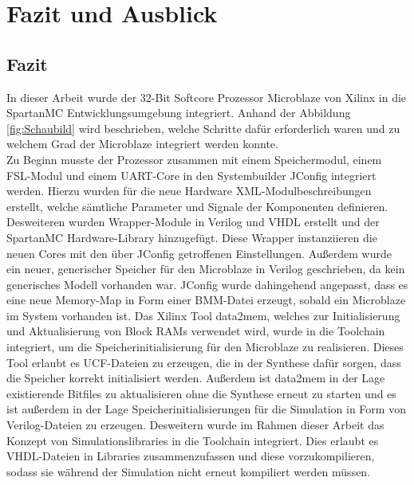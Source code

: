 \chapter{Fazit und Ausblick}
\section{Fazit}
In dieser Arbeit wurde der 32-Bit Softcore Prozessor Microblaze von Xilinx in die SpartanMC Entwicklungsumgebung integriert. Anhand der Abbildung \ref{fig:Schaubild} wird beschrieben, welche Schritte dafür erforderlich waren und zu welchem Grad der Microblaze integriert werden konnte.\\
Zu Beginn musste der Prozessor zusammen mit einem Speichermodul, einem FSL-Modul und einem UART-Core in den Systembuilder JConfig integriert werden. Hierzu wurden für die neue Hardware XML-Modulbeschreibungen erstellt, welche sämtliche Parameter und Signale der Komponenten definieren. Desweiteren wurden Wrapper-Module in Verilog und VHDL erstellt und der SpartanMC Hardware-Library hinzugefügt. Diese Wrapper instanziieren die neuen Cores mit den über JConfig getroffenen Einstellungen. Außerdem wurde ein neuer, generischer Speicher für den Microblaze in Verilog geschrieben, da kein generisches Modell vorhanden war. JConfig wurde dahingehend angepasst, dass es eine neue Memory-Map in Form einer BMM-Datei erzeugt, sobald ein Microblaze im System vorhanden ist. Das Xilinx Tool data2mem, welches zur Initialisierung und Aktualisierung von Block RAMs verwendet wird, wurde in die Toolchain integriert, um die Speicherinitialisierung für den Microblaze zu realisieren. Dieses Tool erlaubt es UCF-Dateien zu erzeugen, die in der Synthese dafür sorgen, dass die Speicher korrekt initialisiert werden. Außerdem ist data2mem in der Lage existierende Bitfiles zu aktualisieren ohne die Synthese erneut zu starten und es ist außerdem in der Lage Speicherinitialisierungen für die Simulation in Form von Verilog-Dateien zu erzeugen. Desweitern wurde im Rahmen dieser Arbeit das Konzept von Simulationslibraries in die Toolchain integriert. Dies erlaubt es VHDL-Dateien in Libraries zusammenzufassen und diese vorzukompilieren, sodass sie während der Simulation nicht erneut kompiliert werden müssen.\\
